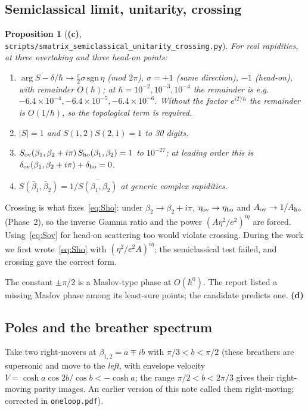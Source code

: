 \documentclass[11pt,a4paper]{article}
\newcommand{\Lc}{\textsf{\textbf{(c)}}}
\newcommand{\Ld}{\textsf{\textbf{(d)}}}
\newcommand{\script}[1]{\texttt{scripts/#1}}
\newtheorem{proposition}{Proposition}[section]
\theoremstyle{remark}\newtheorem{remark}[proposition]{Remark}
\begin{document}
\subsection{Semiclassical limit, unitarity, crossing}
\begin{proposition}[\Lc, \script{smatrix\_semiclassical\_unitarity\_crossing.py}]\label{prop:tests}
For real rapidities, at three overtaking and three head-on points:
\begin{enumerate}
\item $\arg S-\delta/\hbar\to\tfrac{\pi}2\sigma\,\mathrm{sgn}\,\eta$ (mod $2\pi$), $\sigma=+1$ (same direction), $-1$ (head-on), with remainder $O(\hbar)$; at $\hbar=10^{-2},10^{-3},10^{-4}$ the remainder is e.g.\ $-6.4\times10^{-4},-6.4\times10^{-5},-6.4\times10^{-6}$. Without the factor $e^{iT/\hbar}$ the remainder is $O(1/\hbar)$, so the topological term is required.
\item $|S|=1$ and $S(1,2)S(2,1)=1$ to 30 digits.
\item $S_{\rm ov}(\beta_1,\beta_2+i\pi)\,S_{\rm ho}(\beta_1,\beta_2)=1$ to $10^{-27}$; at leading order this is $\delta_{\rm ov}(\beta_1,\beta_2+i\pi)+\delta_{\rm ho}=0$.
\item $S(\bar\beta_1,\bar\beta_2)=1/\overline{S(\beta_1,\beta_2)}$ at generic complex rapidities.
\end{enumerate}
\end{proposition}
Crossing is what fixes~\eqref{eq:Sho}: under $\beta_2\to\beta_2+i\pi$, $\eta_{\rm ov}\to\eta_{\rm ho}$ and $A_{\rm ov}\to1/A_{\rm ho}$ (Phase~2), so the inverse Gamma ratio and the power $(A\eta^2/e^2)^{i\eta}$ are forced. Using~\eqref{eq:Sov} for head-on scattering too would violate crossing. During the work we first wrote~\eqref{eq:Sho} with $(\eta^2/e^2A)^{i\eta}$; the semiclassical test failed, and crossing gave the correct form.

The constant $\pm\pi/2$ is a Maslov-type phase at $O(\hbar^0)$. The report listed a missing Maslov phase among its least-sure points; the candidate predicts one. \Ld

\subsection{Poles and the breather spectrum}
Take two right-movers at $\beta_{1,2}=a\mp ib$ with $\pi/3<b<\pi/2$ (these breathers are supersonic and move to the \emph{left}, with envelope velocity $V=\cosh a\cos2b/\cos b<-\cosh a$; the range $\pi/2<b<2\pi/3$ gives their right-moving parity images. An earlier version of this note called them right-moving; corrected in \texttt{oneloop.pdf}).
\end{document}
